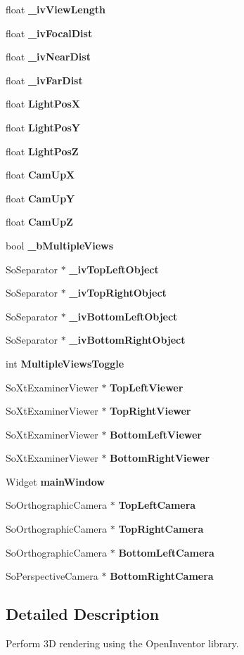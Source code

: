 \begin{CompactItemize}
\item 
float {\bf \_\-iv\-View\-Length}
\item 
float {\bf \_\-iv\-Focal\-Dist}
\item 
float {\bf \_\-iv\-Near\-Dist}
\item 
float {\bf \_\-iv\-Far\-Dist}
\item 
float {\bf Light\-Pos\-X}
\item 
float {\bf Light\-Pos\-Y}
\item 
float {\bf Light\-Pos\-Z}
\item 
float {\bf Cam\-Up\-X}
\item 
float {\bf Cam\-Up\-Y}
\item 
float {\bf Cam\-Up\-Z}
\item 
bool {\bf \_\-b\-Multiple\-Views}
\item 
So\-Separator $\ast$ {\bf \_\-iv\-Top\-Left\-Object}
\item 
So\-Separator $\ast$ {\bf \_\-iv\-Top\-Right\-Object}
\item 
So\-Separator $\ast$ {\bf \_\-iv\-Bottom\-Left\-Object}
\item 
So\-Separator $\ast$ {\bf \_\-iv\-Bottom\-Right\-Object}
\item 
int {\bf Multiple\-Views\-Toggle}
\item 
So\-Xt\-Examiner\-Viewer $\ast$ {\bf Top\-Left\-Viewer}
\item 
So\-Xt\-Examiner\-Viewer $\ast$ {\bf Top\-Right\-Viewer}
\item 
So\-Xt\-Examiner\-Viewer $\ast$ {\bf Bottom\-Left\-Viewer}
\item 
So\-Xt\-Examiner\-Viewer $\ast$ {\bf Bottom\-Right\-Viewer}
\item 
Widget {\bf main\-Window}
\item 
So\-Orthographic\-Camera $\ast$ {\bf Top\-Left\-Camera}
\item 
So\-Orthographic\-Camera $\ast$ {\bf Top\-Right\-Camera}
\item 
So\-Orthographic\-Camera $\ast$ {\bf Bottom\-Left\-Camera}
\item 
So\-Perspective\-Camera $\ast$ {\bf Bottom\-Right\-Camera}
\end{CompactItemize}


\subsection{Detailed Description}
Perform 3D rendering using the Open\-Inventor library.



